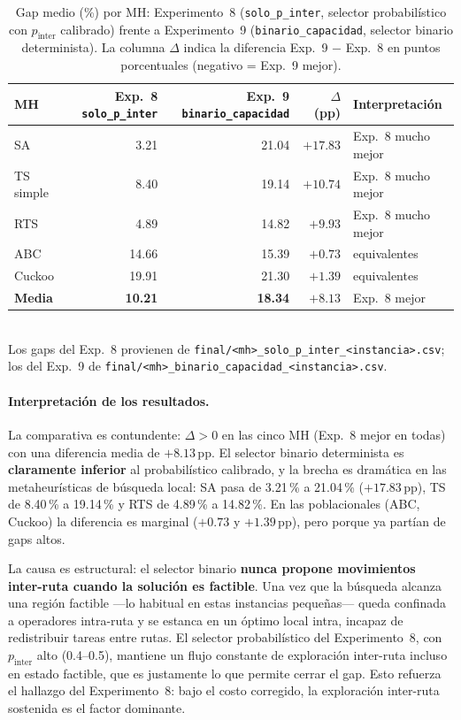 \begin{table}[h]
\centering
\caption{Gap medio (\%) por MH: Experimento~8 (\texttt{solo\_p\_inter},
         selector probabilístico con $p_{\text{inter}}$ calibrado)
         frente a Experimento~9 (\texttt{binario\_capacidad}, selector
         binario determinista). La columna $\Delta$ indica la diferencia
         Exp.~9 $-$ Exp.~8 en puntos porcentuales (negativo = Exp.~9
         mejor).}
\label{tab:comparativa-exp8-exp9}
\small
\begin{tabular}{lrrrl}
\toprule
MH &
  Exp.~8 \texttt{solo\_p\_inter} &
  Exp.~9 \texttt{binario\_capacidad} &
  $\Delta$ (pp) &
  Interpretación \\
\midrule
SA        & 3.21  & 21.04 & $+17.83$ & Exp.~8 mucho mejor \\
TS simple & 8.40  & 19.14 & $+10.74$ & Exp.~8 mucho mejor \\
RTS       & 4.89  & 14.82 & $+9.93$  & Exp.~8 mucho mejor \\
ABC       & 14.66 & 15.39 & $+0.73$  & equivalentes \\
Cuckoo    & 19.91 & 21.30 & $+1.39$  & equivalentes \\
\midrule
\textbf{Media} &
  \textbf{10.21} & \textbf{18.34} & $+8.13$ & Exp.~8 mejor \\
\bottomrule
\end{tabular}
\\[4pt]
\footnotesize
Los gaps del Exp.~8 provienen de
\texttt{final/<mh>\_solo\_p\_inter\_<instancia>.csv};
los del Exp.~9 de
\texttt{final/<mh>\_binario\_capacidad\_<instancia>.csv}.
\end{table}

\paragraph{Interpretación de los resultados.}
La comparativa es contundente: $\Delta > 0$ en las cinco MH (Exp.~8
mejor en todas) con una diferencia media de $+8.13$\,pp. El selector
binario determinista es \textbf{claramente inferior} al probabilístico
calibrado, y la brecha es dramática en las metaheurísticas de
búsqueda local: SA pasa de 3.21\,\% a 21.04\,\% ($+17.83$\,pp), TS de
8.40\,\% a 19.14\,\% y RTS de 4.89\,\% a 14.82\,\%. En las poblacionales
(ABC, Cuckoo) la diferencia es marginal ($+0.73$ y $+1.39$\,pp), pero
porque ya partían de gaps altos.

La causa es estructural: el selector binario \textbf{nunca propone
movimientos inter-ruta cuando la solución es factible}. Una vez que la
búsqueda alcanza una región factible —lo habitual en estas instancias
pequeñas— queda confinada a operadores intra-ruta y se estanca en un
óptimo local intra, incapaz de redistribuir tareas entre rutas. El
selector probabilístico del Experimento~8, con $p_{\text{inter}}$ alto
(0.4--0.5), mantiene un flujo constante de exploración inter-ruta
incluso en estado factible, que es justamente lo que permite cerrar el
gap. Esto refuerza el hallazgo del Experimento~8: bajo el costo
corregido, la exploración inter-ruta sostenida es el factor dominante.


